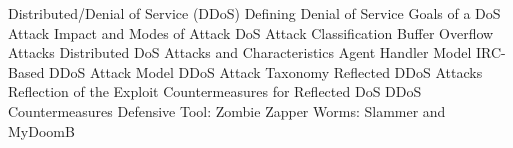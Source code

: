 Distributed/Denial of Service (DDoS)
	Defining Denial of Service
	Goals of a DoS Attack
	Impact and Modes of Attack
	DoS Attack Classification
	Buffer Overflow Attacks
	Distributed DoS Attacks and Characteristics
	Agent Handler Model
	IRC-Based DDoS Attack Model
	DDoS Attack Taxonomy
	Reflected DDoS Attacks
	Reflection of the Exploit
	Countermeasures for Reflected DoS
	DDoS Countermeasures
	Defensive Tool: Zombie Zapper
	Worms: Slammer and MyDoomB